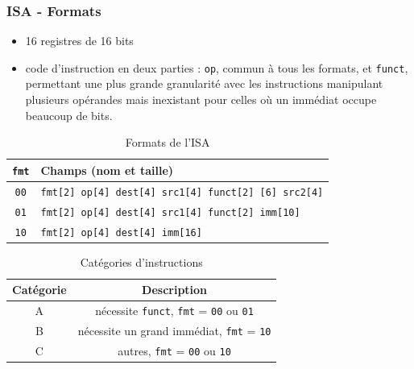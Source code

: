 \documentclass{beamer}
\begin{document}
\begin{frame}
\frametitle{ISA - Formats}
\begin{itemize}
\item 16 registres de 16 bits
\item code d'instruction en deux parties : \texttt{op}, commun à tous les
    formats, et \texttt{funct}, permettant une plus grande granularité avec les
    instructions manipulant plusieurs opérandes mais inexistant pour celles où
    un immédiat occupe beaucoup de bits.
\end{itemize}
\medskip
\begin{table}[ht]
    \centering
    \begin{tiny}
    \begin{tabular}{cl}
    \toprule
    \texttt{fmt} & Champs (nom et taille) \\
    \midrule
    \texttt{00} & \texttt{fmt[2] op[4] dest[4] src1[4] funct[2] [6] src2[4]} \\
    \texttt{01} & \texttt{fmt[2] op[4] dest[4] src1[4] funct[2] imm[10]} \\
    \texttt{10} & \texttt{fmt[2] op[4] dest[4] imm[16]} \\
    \bottomrule
    \end{tabular}
    \end{tiny}
    \caption{Formats de l'ISA}
    \label{tab:formats}
\end{table}
\begin{table}[ht]
    \centering
    \begin{tiny}
    \begin{tabular}{cc}
    \toprule
    Catégorie & Description \\
    \midrule
    A & nécessite \texttt{funct}, \texttt{fmt} = \texttt{00} ou \texttt{01} \\
    B & nécessite un grand immédiat, \texttt{fmt} = \texttt{10} \\
    C & autres, \texttt{fmt} = \texttt{00} ou \texttt{10} \\
    \bottomrule
    \end{tabular}
    \end{tiny}
    \caption{Catégories d'instructions}
    \label{tab:instructions_types}
\end{table}
\end{frame}
\end{document}
